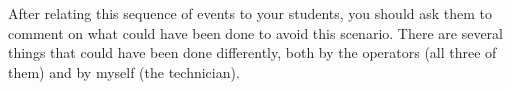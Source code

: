 \vskip 10pt

After relating this sequence of events to your students, you should ask them to comment on what could have been done to avoid this scenario.  There are several things that could have been done differently, both by the operators (all three of them) and by myself (the technician).




